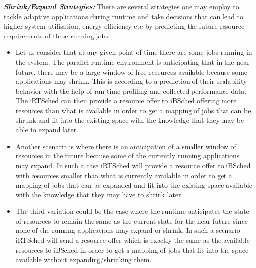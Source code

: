 \noindent
\textbf{\textit{Shrink/Expand Strategies: }}There are several strategies one may employ to tackle adaptive applications during runtime and take decisions that can lead to higher system utilisation, energy efficiency etc by predicting the future resource requirements of these running jobs.:
\begin{itemize} 
\item Let us consider that at any given point of time there are some jobs running in the system. The parallel runtime environment is anticipating that in the near future, there may be a large window of free resources available because some applications may shrink. This is according to a prediction of their scalability behavior with the help of run time profiling and collected performance data. The iRTSched can then provide a resource offer to iBSched offering more resources than what is available in order to get a mapping of jobs that can be shrunk and fit into the existing space with the knowledge that they may be able to expand later.
\item Another scenario is where there is an anticipation of a smaller window of resources in the future because some of the currently running applications may expand. In such a case iRTSched will provide a resource offer to iBSched with resources smaller than what is currently available in order to get a mapping of jobs that can be expanded and fit into the existing space available with the knowledge that they may have to shrink later.
\item The third variation could be the case where the runtime anticipates the state of resources to remain the same as the current state for the near future since none of the running applications may expand or shrink. In such a scenario iRTSched will send a resource offer which is exactly the same as the available resources to iBSched in order to get a mapping of jobs that fit into the space available without expanding/shrinking them. 
\end{itemize}
